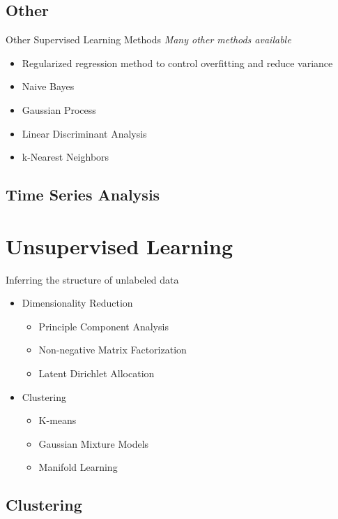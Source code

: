 \documentclass[10pt]{beamer}
\begin{document}
\subsection{Other}
\begin{frame}{Other Supervised Learning Methods}
\emph{Many other methods available}
	\begin{itemize}
		\item Regularized regression method to control overfitting and reduce variance
		\item Naive Bayes
		\item Gaussian Process
		\item Linear Discriminant Analysis
		\item k-Nearest Neighbors
	\end{itemize}
\end{frame}

\subsection{Time Series Analysis}

\section{Unsupervised Learning}

\begin{frame}{Inferring the structure of unlabeled data}
	\begin{itemize}
		\item Dimensionality Reduction
		\begin{itemize}
			\item Principle Component Analysis
			\item Non-negative Matrix Factorization
			\item Latent Dirichlet Allocation
		\end{itemize}
		\item Clustering
		\begin{itemize}
			\item K-means
			\item Gaussian Mixture Models
			\item Manifold Learning
		\end{itemize}
	\end{itemize}
\end{frame}

\subsection{Clustering}
\end{document}
